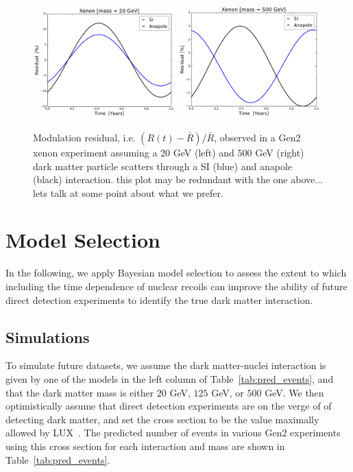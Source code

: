 \documentclass[11pt]{article}
\newcommand{\sjw}[1]{{\color{red} #1}}
\begin{document}
\begin{figure}
\centering
\includegraphics[width=0.49\textwidth]{plots/Xenon_SIvsAnapole_20GeV_Residual_Theory.pdf}
\includegraphics[width=0.49\textwidth]{plots/Xenon_SIvsAnapole_500GeV_Residual_Theory.pdf}
\caption{\label{fig:xenon_residual}
Modulation residual, i.e. $(R(t) - \bar{R})/\bar{R}$, observed in a Gen2 xenon experiment assuming a $20$ GeV (left) and $500$ GeV (right) dark matter particle scatters through a SI (blue) and anapole (black) interaction. \sjw{this plot may be redundant with the one above... lets talk at some point about what we prefer.}}
\end{figure}

\section{Model Selection}

In the following, we apply Bayesian model selection to assess the extent to which including the time dependence of nuclear recoils can improve the ability of future direct detection experiments to identify the true dark matter interaction. 
   

\subsection{Simulations \label{sec:sims}}

To simulate future datasets, we assume the dark matter-nuclei interaction is given by one of the models in the left column of Table~\ref{tab:pred_events}, and that the dark matter mass is either $20$ GeV, $125$ GeV, or $500$ GeV. We then optimistically assume that direct detection experiments are on the verge of of detecting dark matter, and set the cross section to be the value maximally allowed by LUX~\cite{Akerib:2016vxi}. The predicted number of events in various Gen2 experiments using this cross section for each interaction and mass are shown in Table~\ref{tab:pred_events}. 
\end{document}
